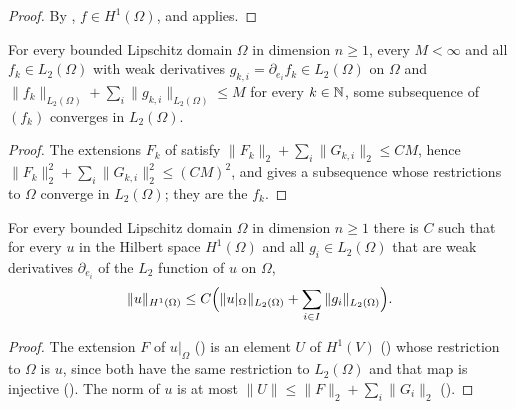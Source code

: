 \begin{proof}
\leanok
By , $f \in H^1(\Omega)$, and
 applies.
\end{proof}

\begin{corollary}
\label{cor:rellich-weak-sobolev}
\leanok
{}
For every bounded Lipschitz domain $\Omega$ in dimension $n \geq 1$, every $M < \infty$ and all
$f_k \in L_2(\Omega)$ with weak derivatives $g_{k,i} = \partial_{e_i} f_k \in L_2(\Omega)$ on
$\Omega$ and $\|f_k\|_{L_2(\Omega)} + \sum_i \|g_{k,i}\|_{L_2(\Omega)} \leq M$ for every
$k \in \mathbb{N}$, some subsequence of $(f_k)$ converges in $L_2(\Omega)$.
\end{corollary}

\begin{proof}
\leanok
The extensions $F_k$ of  satisfy
$\|F_k\|_2 + \sum_i \|G_{k,i}\|_2 \leq C M$, hence
$\|F_k\|_2^2 + \sum_i \|G_{k,i}\|_2^2 \leq (C M)^2$, and  gives
a subsequence whose restrictions to $\Omega$ converge in $L_2(\Omega)$; they are the $f_k$.
\end{proof}

\begin{corollary}
\label{cor:sobolev-quotient-norm}
\leanok
{}
For every bounded Lipschitz domain $\Omega$ in dimension $n \geq 1$ there is $C$ such that for
every $u$ in the Hilbert space $H^1(\Omega)$ and all $g_i \in L_2(\Omega)$ that are weak
derivatives $\partial_{e_i}$ of the $L_2$ function of $u$ on $\Omega$,
\[
  \|u\|_{H^1(\Omega)} \leq C \Bigl(\|u|_\Omega\|_{L_2(\Omega)} + \sum_{i \in I}
  \|g_i\|_{L_2(\Omega)}\Bigr) .
\]
\end{corollary}

\begin{proof}
\leanok
The extension $F$ of $u|_\Omega$ () is an element $U$ of $H^1(V)$
() whose restriction to $\Omega$ is $u$, since both have the same
restriction to $L_2(\Omega)$ and that map is injective (). The
norm of $u$ is at most $\|U\| \leq \|F\|_2 + \sum_i \|G_i\|_2$
().
\end{proof}

